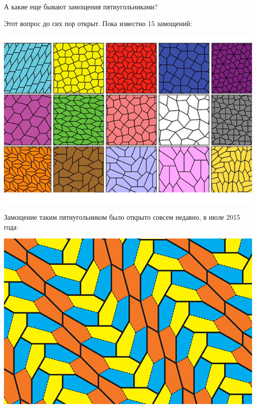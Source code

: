 \documentclass{beamer}
\begin{document}
\begin{frame}
А какие еще бывают замощения пятиугольниками?

\pause

\medskip

Этот вопрос до сих пор открыт. Пока известно 15 замощений:

\begin{center}
\includegraphics[width=\textwidth]{5-all.jpg}
\end{center}

\end{frame}

\begin{frame}

Замощение таким пятиугольником было открыто совсем недавно, в июле 2015 года:

\begin{center}
\includegraphics[width=\textwidth]{5-new.jpg}
\end{center}

\end{frame}
\end{document}
